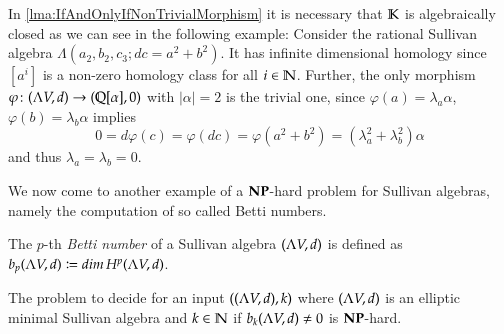  \begin{Remark}
  In \ref{lma:IfAndOnlyIfNonTrivialMorphism} it is necessary that $\mathbb{K}$ is algebraically closed 
  as we can see in the following example: \newline
  Consider the rational Sullivan algebra
  $\Lambda(a_2, b_2, c_3; dc = a^2 + b^2)$. It has infinite dimensional homology since $ [a^i]$ is a non-zero homology
  class for all $i \in \mathbb{N}$. Further, the only morphism $\varphi \colon (\Lambda V,d) \to (\mathbb{Q}[\alpha], 0)$ with $|\alpha| = 2$ is the
  trivial one, since $\varphi (a) = \lambda_a \alpha$, $\varphi (b) = \lambda_b \alpha$ implies 
  $$ 0 = d\varphi (c) = \varphi(dc) = \varphi( a^2 + b^2) = (\lambda_a^2 + \lambda_b^2) \alpha$$ and thus
  $\lambda_a = \lambda_b = 0$.
  
 \end{Remark}
  
 
 We now come to another example of a $\mathbf{NP}$-hard problem for Sullivan algebras, namely the computation
 of so called Betti numbers.
 
 \begin{Definition}
  The $p$-th \emph{Betti number} of a Sullivan algebra $(\Lambda V,d)$ is defined as \newline 
  ${b_p (\Lambda V,d) \coloneqq dim \, H^p (\Lambda V,d)}$.
 \end{Definition}


 \begin{Theorem}
 \label{thm:AlgebrasBettiNumbersLemma}
  The problem to decide for an input $((\Lambda V,d),k)$ where $(\Lambda V,d)$ is an elliptic minimal Sullivan algebra 
  and $k \in \mathbb{N}$ if $b_k (\Lambda V,d) \neq 0$ is $\mathbf{NP}$-hard.
 \end{Theorem}


